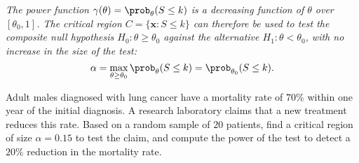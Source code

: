 \begin{remark}
\bit
\it The power function $\gamma(\theta)=\prob_{\theta}(S\leq k)$ is a \emph{decreasing} function of $\theta$ over $[\theta_0,1]$. 
\it The critical region $C=\{\mathbf{x}:S\leq k\}$ can therefore be used to test the \emph{composite} null hypothesis $H_0:\theta\geq\theta_0$ against the alternative $H_1:\theta<\theta_0$, with no increase in the size of the test:
\[
\alpha = \max_{\theta\geq\theta_0}\prob_{\theta}(S\leq k) = \prob_{\theta_0}(S\leq k).
\]
\eit
\end{remark}




\begin{example}
Adult males diagnosed with lung cancer have a mortality rate of $70\%$ within one year of the initial diagnosis. A research laboratory claims that a new treatment reduces this rate. Based on a random sample of $20$ patients, find a critical region of size $\alpha=0.15$ to test the claim, and compute the power of the test to detect a $20\%$ reduction in the mortality rate.
\end{example}

